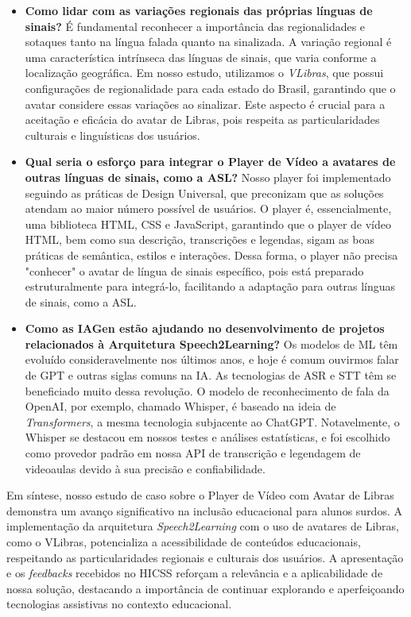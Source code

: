 \begin{itemize}
    \item \textbf{Como lidar com as variações regionais das próprias línguas de sinais?}
    É fundamental reconhecer a importância das regionalidades e sotaques tanto na língua falada quanto na sinalizada. A variação regional é uma característica intrínseca das línguas de sinais, que varia conforme a localização geográfica. Em nosso estudo, utilizamos o \textit{VLibras}, que possui configurações de regionalidade para cada estado do Brasil, garantindo que o avatar considere essas variações ao sinalizar. Este aspecto é crucial para a aceitação e eficácia do avatar de Libras, pois respeita as particularidades culturais e linguísticas dos usuários.
    \item \textbf{Qual seria o esforço para integrar o Player de Vídeo a avatares de outras línguas de sinais, como a ASL?}
    Nosso player foi implementado seguindo as práticas de Design Universal, que preconizam que as soluções atendam ao maior número possível de usuários. O player é, essencialmente, uma biblioteca HTML, CSS e JavaScript, garantindo que o player de vídeo HTML, bem como sua descrição, transcrições e legendas, sigam as boas práticas de semântica, estilos e interações. Dessa forma, o player não precisa "conhecer" o avatar de língua de sinais específico, pois está preparado estruturalmente para integrá-lo, facilitando a adaptação para outras línguas de sinais, como a ASL.
    \item \textbf{Como as IAGen estão ajudando no desenvolvimento de projetos relacionados à Arquitetura Speech2Learning?}
    Os modelos de ML têm evoluído consideravelmente nos últimos anos, e hoje é comum ouvirmos falar de GPT e outras siglas comuns na IA. As tecnologias de ASR e STT têm se beneficiado muito dessa revolução. O modelo de reconhecimento de fala da OpenAI, por exemplo, chamado Whisper, é baseado na ideia de \textit{Transformers}, a mesma tecnologia subjacente ao ChatGPT. Notavelmente, o Whisper se destacou em nossos testes e análises estatísticas, e foi escolhido como provedor padrão em nossa API de transcrição e legendagem de videoaulas devido à sua precisão e confiabilidade.
\end{itemize}

Em síntese, nosso estudo de caso sobre o Player de Vídeo com Avatar de Libras demonstra um avanço significativo na inclusão educacional para alunos surdos. A implementação da arquitetura \textit{Speech2Learning} com o uso de avatares de Libras, como o VLibras, potencializa a acessibilidade de conteúdos educacionais, respeitando as particularidades regionais e culturais dos usuários. A apresentação e os \textit{feedbacks} recebidos no HICSS reforçam a relevância e a aplicabilidade de nossa solução, destacando a importância de continuar explorando e aperfeiçoando tecnologias assistivas no contexto educacional.

